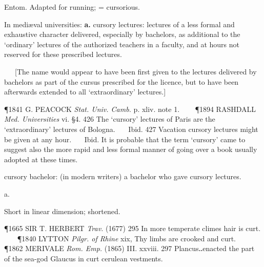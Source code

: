 \begin{description}[wide, labelwidth=!, labelindent=0pt]
\begin{myenumerate}
 Entom. Adapted for running; = cursorious.

 In mediæval universities: \textbf{a.} cursory lectures: lectures of a less formal and exhaustive character delivered, especially by bachelors, as additional to the ‘ordinary’ lectures of the authorized teachers in a faculty, and at hours not reserved for these prescribed lectures.

   [The name would appear to have been first given to the lectures delivered by bachelors as part of the cursus prescribed for the licence, but to have been afterwards extended to all ‘extraordinary’ lectures.]

\P 1841 G. PEACOCK  \textit{Stat. Univ. Camb.} p. xliv. note 1.    
\P 1894 RASHDALL  \textit{Med. Universities} vi. §4. 426 The ‘cursory’ lectures of Paris are the ‘extraordinary’ lectures of Bologna.    Ibid. 427 Vacation cursory lectures might be given at any hour.    Ibid. It is probable that the term ‘cursory’ came to suggest also the more rapid and less formal manner of going over a book usually adopted at these times.

 cursory bachelor: (in modern writers) a bachelor who gave cursory lectures.
\end{myenumerate}


 a.

\noindent {}


\begin{myenumerate}

 Short in linear dimension; shortened.

\P 1665 SIR T. HERBERT  \textit{Trav.} (1677) 295 In more temperate climes hair is curt.    
\P 1840 LYTTON  \textit{Pilgr. of Rhine} xix, Thy limbs are crooked and curt.    
\P 1862 MERIVALE  \textit{Rom. Emp.} (1865) III. xxviii. 297 Plancus‥enacted the part of the sea-god Glaucus in curt cerulean vestments.


\end{myenumerate}
\end{description}
